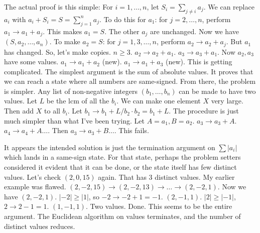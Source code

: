 The actual proof is this simple:
For $i=1, \dots, n$, let $S_i = \sum_{j \neq i} a_j$. We can replace $a_i$ with $a_i+S_i = S = \sum_{j=1}^n a_j$.
To do this for $a_1$: for $j=2, \dots, n$, perform $a_1 \to a_1+a_j$. This makes $a_1=S$. The other $a_j$ are unchanged.
Now we have $(S, a_2, \dots, a_n)$.
To make $a_2=S$: for $j=1, 3, \dots, n$, perform $a_2 \to a_2+a_j$. But $a_1$ has changed.
So, let's make copies. $n \ge 3$.
$a_2 \to a_2+a_1$.
$a_3 \to a_3+a_1$.
Now $a_2, a_3$ have some values.
$a_1 \to a_1+a_2$ (new).
$a_1 \to a_1+a_3$ (new).
This is getting complicated. The simplest argument is the sum of absolute values. It proves that we can reach a state where all numbers are same-signed. From there, the problem is simpler. Any list of non-negative integers $(b_1, \dots, b_n)$ can be made to have two values. Let $L$ be the lcm of all the $b_i$. We can make one element $X$ very large. Then add $X$ to all $b_i$.
Let $b_1 \to b_1+L/b_2 \cdot b_2 = b_1+L$.
The procedure is just much simpler than what I've been trying.
Let $A = a_1, B = a_2$. $a_3 \to a_3+A$. $a_4 \to a_4+A \dots$. Then $a_3 \to a_3+B \dots$. This fails.

It appears the intended solution is just the termination argument on $\sum|a_i|$ which lands in a same-sign state. For that state, perhaps the problem setters considered it evident that it can be done, or the state itself has few distinct values. Let's check $(2,0,15)$ again. That has 3 distinct values. My earlier example was flawed.
$(2, -2, 15) \to (2, -2, 13) \to \dots \to (2,-2,1)$.
Now we have $(2,-2,1)$. $|-2|\ge|1|$, so $-2\to -2+1=-1$. $(2,-1,1)$.
$|2|\ge|-1|$, $2\to 2-1=1$. $(1,-1,1)$. Two values. Done.
This seems to be the entire argument. The Euclidean algorithm on values terminates, and the number of distinct values reduces.